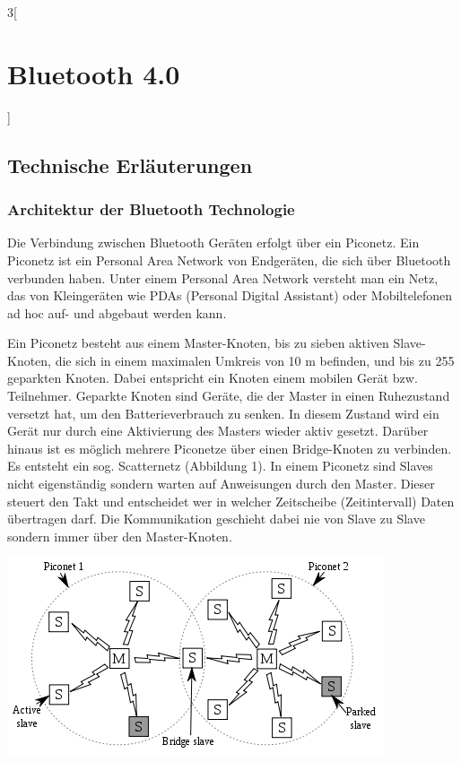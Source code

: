 \begin{multicols}{3}[\section{Bluetooth 4.0}]
\subsection*{Technische Erläuterungen}
\subsubsection*{Architektur der Bluetooth Technologie}
Die Verbindung zwischen Bluetooth Geräten erfolgt über ein Piconetz. Ein Piconetz ist ein Personal Area Network von Endgeräten, die sich über Bluetooth verbunden haben. Unter einem Personal Area Network versteht man ein Netz, das von Kleingeräten wie PDAs (Personal Digital Assistant) oder Mobiltelefonen ad hoc auf- und abgebaut werden kann. 

Ein Piconetz besteht aus einem Master-Knoten, bis zu sieben aktiven Slave-Knoten, die sich in einem maximalen Umkreis von 10 m befinden, und bis zu 255 geparkten Knoten. Dabei entspricht ein Knoten einem mobilen Gerät bzw. Teilnehmer. Geparkte Knoten sind Geräte, die der Master in einen Ruhezustand versetzt hat, um den Batterieverbrauch zu senken. In diesem Zustand wird ein Gerät nur durch eine Aktivierung des Masters wieder aktiv gesetzt. Darüber hinaus ist es möglich mehrere Piconetze über einen Bridge-Knoten zu verbinden. Es entsteht ein sog. Scatternetz (Abbildung 1). In einem Piconetz sind Slaves nicht eigenständig sondern warten auf Anweisungen durch den Master. Dieser steuert den Takt und entscheidet wer in welcher Zeitscheibe (Zeitintervall) Daten übertragen darf. Die Kommunikation geschieht dabei nie von Slave zu Slave sondern  immer über den Master-Knoten.\cite{Bluetooth_4.2}

\begin{Figure}
\includegraphics[width=\linewidth]{Kapitel/Bluetooth_4/Grafiken/piconetz.png}
\label{fig:vorlage.vorlesungssaal}
\end{Figure}


\end{multicols}
